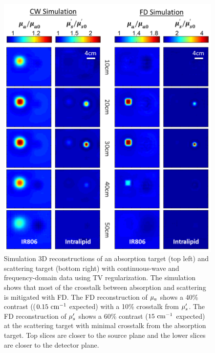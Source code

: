 \begin{figure}[ph]
\begin{center}
\includegraphics[width=14.5cm]{./figures/4_Gen3/3DsimFDCW.png}
\caption[Simulated 3D reconstructions of an absorption target (top left) and scattering target (bottom right) with CW and FD]{Simulation 3D reconstructions of an absorption target (top left) and scattering target (bottom right) with continuous-wave and frequency-domain data using TV regularization. The simulation shows that most of the crosstalk between absorption and scattering is mitigated with FD. The FD reconstruction of $\mu_a$ shows a 40\% contrast (($0.15~\rm{cm}^{-1}$ expected) with a 10\% crosstalk from $\mu_s^{\prime}$. The FD reconstruction of $\mu_s^{\prime}$ shows a 60\% contrast ($15~\rm{cm}^{-1}$ expected) at the scattering target with minimal crosstalk from the absorption target. Top slices are closer to the source plane and the lower slices are closer to the detector plane.}
\label{fig:3DsimFDCW}
\end{center}
\end{figure}
